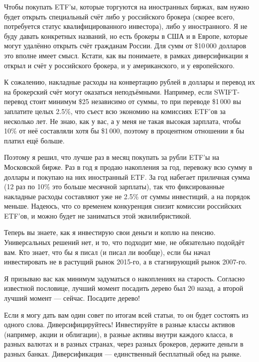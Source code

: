 Чтобы покупать ETF'ы, которые торгуются на иностранных биржах, вам нужно будет 
открыть специальный счёт либо у российского брокера (скорее всего, потребуется 
статус квалифицированного инвестора), либо у иностранного. Я не буду давать 
конкретных названий, но есть брокеры в США и в Европе, которые могут удалённо 
открыть счёт гражданам России. Для сумм от \$10\,000 долларов это вполне имеет 
смысл. Кстати, как вы понимаете, в рамках диверсификации я открыл и счёт у 
российского брокера, и у американского, и у европейского.

К сожалению, накладные расходы на конвертацию рублей в доллары и перевод их на 
брокерский счёт могут оказаться неподъёмными. Например, если SWIFT-перевод стоит 
минимум \$25 независимо от суммы, то при переводе \$1\,000 вы заплатите целых 
2.5\%, что съест всю экономию на комиссиях ETF'ов за несколько лет. Не знаю, как 
у вас, а у меня не такая высокая зарплата, чтобы 10\% от неё составляли хотя бы 
\$1\,000, поэтому в процентном отношении я бы платил ещё больше.

Поэтому я решил, что лучше раз в месяц покупать за рубли ETF'ы на Московской 
бирже. Раз в год я продаю накопления за год, перевожу всю сумму в доллары и 
покупаю на них иностранный ETF. За год набегает приличная сумма (12 раз по 10\% 
это больше месячной зарплаты), так что фиксированные накладные расходы 
составляют уже не 2.5\% от суммы инвестиций, а на порядок меньше. Надеюсь, что 
со временем конкуренция снизит комиссии российских ETF'ов, и можно будет не 
заниматься этой эквилибристикой.

Теперь вы знаете, как я инвестирую свои деньги и коплю на пенсию. Универсальных 
решений нет, и то, что подходит мне, не обязательно подойдёт вам. Кто знает, что 
бы я писал (и писал ли вообще), если бы начал инвестировать не в растущий рынок 
2015-го, а в стагнирующий рынок 2007-го.

Я призываю вас как минимум задуматься о накоплениях на старость. Согласно 
известной пословице, лучший момент посадить дерево был 20 назад, а второй лучший
момент --- сейчас. Посадите дерево!


Если я могу дать вам один совет по итогам всей статьи, то он будет состоять из 
одного слова. Диверсифицируйтесь! Инвестируйте в разные классы активов 
(например, акции и облигации), в разные активы внутри каждого класса, в разных
валютах и в разных странах, через разных брокеров, держите деньги в разных 
банках. Диверсификация --- единственный бесплатный обед на рынке.

